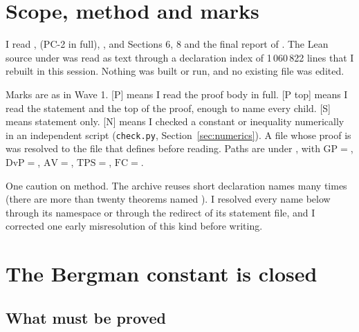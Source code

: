 \documentclass[11pt]{article}
\newcommand{\mP}{\textsf{[P]}}
\newcommand{\mPt}{\textsf{[P top]}}
\newcommand{\mS}{\textsf{[S]}}
\newcommand{\mN}{\textsf{[N]}}
\theoremstyle{remark}
\begin{document}
\section{Scope, method and marks}

I read ,  (PC-2 in full), , and Sections 6, 8 and the final report of . The Lean source under  was read as text through a declaration index of 1\,060\,822 lines that I rebuilt in this session. Nothing was built or run, and no existing file was edited.

Marks are as in Wave 1. \mP{} means I read the proof body in full. \mPt{} means I read the statement and the top of the proof, enough to name every child. \mS{} means statement only. \mN{} means I checked a constant or inequality numerically in an independent script (\texttt{check.py}, Section~\ref{sec:numerics}). A  file whose proof is  was resolved to the file that defines  before reading. Paths are under , with $\mathrm{GP}=$, $\mathrm{DvP}=$, $\mathrm{AV}=$, $\mathrm{TPS}=$, $\mathrm{FC}=$.

One caution on method. The archive reuses short declaration names many times (there are more than twenty theorems named ). I resolved every name below through its namespace or through the redirect of its statement file, and I corrected one early misresolution of this kind before writing.

\section{The Bergman constant is closed}\label{sec:bergman}

\subsection{What must be proved}
\end{document}
